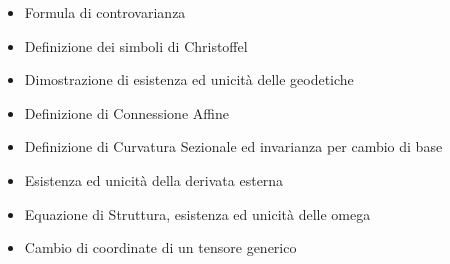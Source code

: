 \documentclass[a4paper,NoNotes,GeneralMath]{stdmdoc}
\begin{document}
\begin{itemize}
\item Formula di controvarianza
\item Definizione dei simboli di Christoffel
\item Dimostrazione di esistenza ed unicità delle geodetiche
\item Definizione di Connessione Affine
\item Definizione di Curvatura Sezionale ed invarianza per cambio di base
\item Esistenza ed unicità della derivata esterna
\item Equazione di Struttura, esistenza ed unicità delle omega
\item Cambio di coordinate di un tensore generico
\end{itemize}
        
\end{document}
